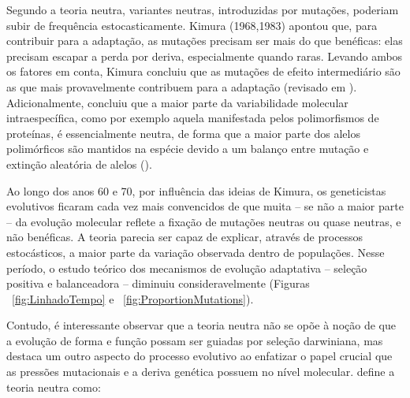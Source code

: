 \begin{refsection}
	Segundo a teoria neutra, variantes neutras, introduzidas por mutações, poderiam subir de frequência estocasticamente. Kimura (1968,1983)\nocite{Kimura1968,Kimura1983} apontou que, para contribuir para a adaptação, as mutações precisam ser mais do que benéficas: elas precisam escapar a perda por deriva, especialmente quando raras. Levando ambos os fatores em conta, Kimura concluiu que as mutações de efeito intermediário são as que mais provavelmente contribuem para a adaptação (revisado em \cite{Orr2005}). Adicionalmente, concluiu que a maior parte da variabilidade molecular intraespecífica, como por exemplo aquela manifestada pelos polimorfismos de proteínas, é essencialmente neutra, de forma que a maior parte dos alelos polimórficos são mantidos na espécie devido a um balanço entre mutação e extinção aleatória de alelos (\cite{Kimura1983}). 
%


%
	
    Ao longo dos anos 60 e 70, por influência das ideias de Kimura, os geneticistas evolutivos ficaram cada vez mais convencidos de que muita -- se não a maior parte -- da evolução molecular reflete a fixação de mutações neutras ou quase neutras, e não benéficas. A teoria parecia ser capaz de explicar, através de processos estocásticos, a maior parte da variação observada dentro de populações. Nesse período, o estudo teórico dos mecanismos de evolução adaptativa -- seleção positiva e balanceadora -- diminuiu consideravelmente \parencite{Orr2005} (Figuras ~\ref{fig:LinhadoTempo} e ~\ref{fig:ProportionMutations}).
%

	Contudo, é interessante observar que a teoria neutra não se opõe à noção de que a evolução de forma e função possam ser guiadas por seleção darwiniana, mas destaca um outro aspecto do processo evolutivo ao enfatizar o papel crucial que as pressões mutacionais e a deriva genética possuem no nível molecular. \textcite{Kimura1983} define a teoria neutra como:
    

\end{refsection}
